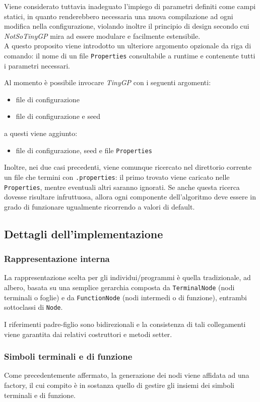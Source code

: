 \documentclass{../llncs}
\begin{document}
Viene considerato tuttavia inadeguato l'impiego di parametri definiti come campi statici, in quanto renderebbero necessaria una nuova compilazione ad ogni modifica nella configurazione, violando inoltre il principio di design secondo cui \emph{NotSoTinyGP} mira ad essere modulare e facilmente estensibile.\\

A questo proposito viene introdotto un ulteriore argomento opzionale da riga di comando: il nome di un file \texttt{Properties} consultabile a runtime e contenente tutti i parametri necessari.

\noindent Al momento è possibile invocare \emph{TinyGP} con i seguenti argomenti:
\begin{itemize}
\item file di configurazione
\item file di configurazione e seed
\end{itemize}
a questi viene aggiunto:
\begin{itemize}
\item file di configurazione, seed e file \texttt{Properties}
\end{itemize}

Inoltre, nei due casi precedenti, viene comunque ricercato nel direttorio corrente un file che termini con \texttt{.properties}: il primo trovato viene caricato nelle \texttt{Properties}, mentre eventuali altri saranno ignorati. Se anche questa ricerca dovesse risultare infruttuosa, allora ogni componente dell'algoritmo deve essere in grado di funzionare ugualmente ricorrendo a valori di default.

\subsection{Dettagli dell'implementazione}
\subsubsection{Rappresentazione interna}
La rappresentazione scelta per gli individui/programmi è quella tradizionale, ad albero, basata su una semplice gerarchia composta da \texttt{TerminalNode} (nodi terminali o foglie) e da \texttt{FunctionNode} (nodi intermedi o di funzione), entrambi sottoclassi di \texttt{Node}.

I riferimenti padre-figlio sono bidirezionali e la consistenza di tali collegamenti viene garantita dai relativi costruttori e metodi setter.

\subsubsection{Simboli terminali e di funzione}
Come precedentemente affermato, la generazione dei nodi viene affidata ad una factory, il cui compito è in sostanza quello di gestire gli insiemi dei simboli terminali e di funzione. %
\end{document}
